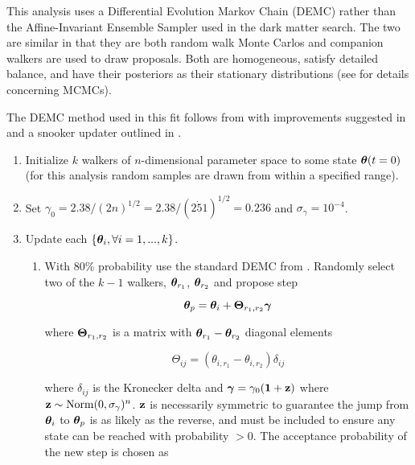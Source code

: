 This analysis uses a Differential Evolution Markov Chain (DEMC) rather than the Affine-Invariant Ensemble Sampler used in the dark matter
search.  The two are similar in that they are both random walk Monte Carlos and companion walkers are used to draw proposals.  Both are
homogeneous, satisfy detailed balance, and have their posteriors as their stationary distributions (see
 for details concerning MCMCs).

The DEMC method used in this fit follows from
 with improvements suggested in  and a snooker updater outlined in .

\begin{enumerate}
\item Initialize $k$ walkers of $n$-dimensional parameter space to some state $\boldsymbol{\theta}(t = 0)$ (for this analysis random samples
are drawn from within a specified range).

\item Set $\gamma_0 = 2.38 / (2 n)^{1/2} = 2.38 / (2 \dot 51)^{1/2} = 0.236$ and $\sigma_{\gamma} = 10^{-4}$.

\item \label{itm:update_demc} Update each $\{\boldsymbol{\theta}_i, \forall i = 1, ..., k\}$.
\begin{enumerate}
\item \label{itm:update_demc_normal} With 80\% probability use the standard DEMC from .  Randomly
select two of the $k - 1$ walkers, $\boldsymbol{\theta}_{r_1}$, $\boldsymbol{\theta}_{r_2}$ and propose step

\vspace{-10pt}

\begin{equation}
\boldsymbol{\theta}_p = \boldsymbol{\theta}_i + \boldsymbol{\Theta}_{r_1, r_2} \boldsymbol{\gamma}
\label{eq:elifetime_fit_mcmc_update_demc}
\end{equation}

\noindent where $\boldsymbol{\Theta}_{r_1, r_2}$ is a matrix with $\boldsymbol{\theta}_{r_1} - \boldsymbol{\theta}_{r_2}$ diagonal
elements

\vspace{-10pt}

\begin{equation}
\Theta_{ij} = (\theta_{i, r_1} - \theta_{i, r_2}) \delta_{ij}
\end{equation}

\noindent where $\delta_{ij}$ is the Kronecker delta  and $\boldsymbol{\gamma} = \gamma_0 (\mathbf{1} + \mathbf{z})$ where
$\mathbf{z} \sim \mathrm{Norm}(0, \sigma_{\gamma})^n$.  $\mathbf{z}$ is necessarily symmetric to guarantee the jump from
$\boldsymbol{\theta}_i$ to $\boldsymbol{\theta}_p$ is as likely as the reverse, and must be included to ensure any state can be reached with
probability $> 0$.  The acceptance probability of the new step is chosen as


\end{enumerate}
\end{enumerate}
